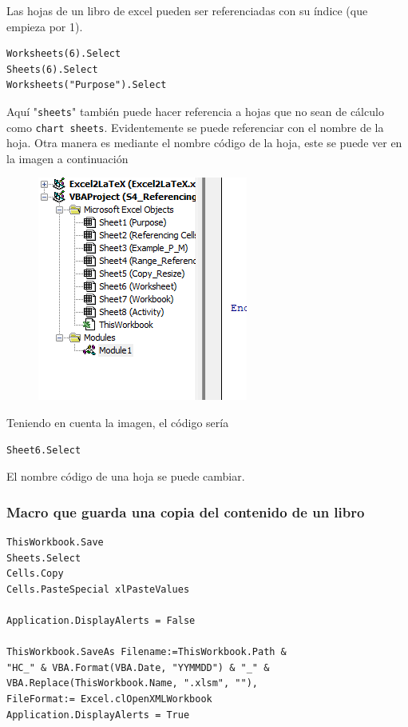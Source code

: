 Las hojas de un libro de excel pueden ser referenciadas con su índice (que empieza por 1).

\begin{verbatim}
Worksheets(6).Select
Sheets(6).Select
Worksheets("Purpose").Select
\end{verbatim}

Aquí "\texttt{sheets}" también puede hacer referencia a hojas que no sean de cálculo como \texttt{chart sheets}. Evidentemente se puede referenciar con el nombre de la hoja. Otra manera es mediante el nombre código de la hoja, este se puede ver en la imagen a continuación


\begin{figure}[H]
    \centering
    \includegraphics{ExcelMacro/codesheets.png}
\end{figure}

Teniendo en cuenta la imagen, el código sería

\begin{verbatim}
Sheet6.Select
\end{verbatim}

El nombre código de una hoja se puede cambiar.

\subsubsection{Macro que guarda una copia del contenido de un libro}

\begin{verbatim}
ThisWorkbook.Save
Sheets.Select
Cells.Copy
Cells.PasteSpecial xlPasteValues

Application.DisplayAlerts = False

ThisWorkbook.SaveAs Filename:=ThisWorkbook.Path & 
"HC_" & VBA.Format(VBA.Date, "YYMMDD") & "_" & VBA.Replace(ThisWorkbook.Name, ".xlsm", ""),
FileFormat:= Excel.clOpenXMLWorkbook
Application.DisplayAlerts = True

\end{verbatim}

